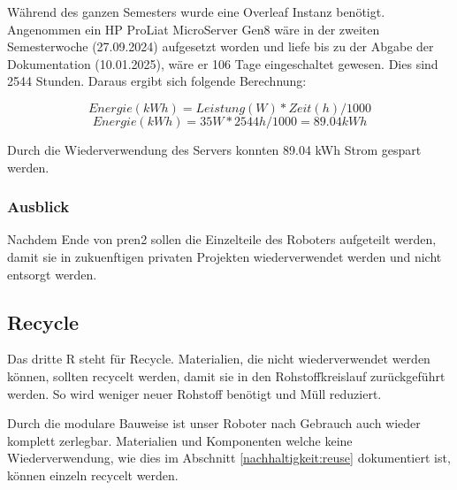 Während des ganzen Semesters wurde eine Overleaf Instanz benötigt. Angenommen ein HP ProLiat MicroServer Gen8 wäre in der zweiten Semesterwoche (27.09.2024) aufgesetzt worden und liefe bis zu der Abgabe der Dokumentation (10.01.2025), wäre er 106 Tage eingeschaltet gewesen.
Dies sind 2544 Stunden. Daraus ergibt sich folgende Berechnung:

\[Energie(kWh)=Leistung(W) * Zeit(h) / 1000\]
\[Energie(kWh)=35W * 2544h / 1000 = 89.04kWh\]

 Durch die Wiederverwendung des Servers konnten 89.04 kWh Strom gespart werden.

 
\subsubsection{Ausblick}

Nachdem Ende von \acrshort{pren2} sollen die Einzelteile des Roboters aufgeteilt werden, damit sie in zukuenftigen privaten Projekten wiederverwendet werden und nicht entsorgt werden.



\subsection{Recycle}

Das dritte R steht für Recycle. Materialien, die nicht wiederverwendet werden können, sollten recycelt werden, damit sie in den Rohstoffkreislauf zurückgeführt werden. So wird weniger neuer Rohstoff benötigt und Müll reduziert.

Durch die modulare Bauweise ist unser Roboter nach Gebrauch auch wieder komplett zerlegbar. Materialien und Komponenten welche keine Wiederverwendung, wie dies im Abschnitt \ref{nachhaltigkeit:reuse} dokumentiert ist, können einzeln recycelt werden.




